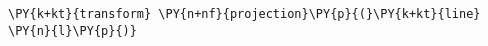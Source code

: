 \begin{Verbatim}[commandchars=\\\{\}]
    \PY{k+kt}{transform} \PY{n+nf}{projection}\PY{p}{(}\PY{k+kt}{line} \PY{n}{l}\PY{p}{)}
\end{Verbatim}

